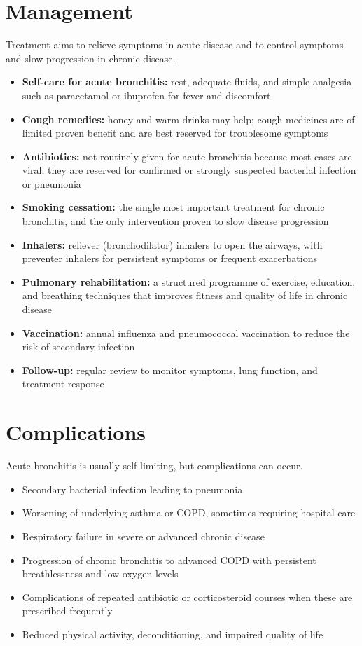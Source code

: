 \section*{Management}
Treatment aims to relieve symptoms in acute disease and to control symptoms and slow progression in chronic disease.

\begin{itemize}
    \item \textbf{Self-care for acute bronchitis:} rest, adequate fluids, and simple analgesia such as paracetamol or ibuprofen for fever and discomfort
    \item \textbf{Cough remedies:} honey and warm drinks may help; cough medicines are of limited proven benefit and are best reserved for troublesome symptoms
    \item \textbf{Antibiotics:} not routinely given for acute bronchitis because most cases are viral; they are reserved for confirmed or strongly suspected bacterial infection or pneumonia
    \item \textbf{Smoking cessation:} the single most important treatment for chronic bronchitis, and the only intervention proven to slow disease progression
    \item \textbf{Inhalers:} reliever (bronchodilator) inhalers to open the airways, with preventer inhalers for persistent symptoms or frequent exacerbations
    \item \textbf{Pulmonary rehabilitation:} a structured programme of exercise, education, and breathing techniques that improves fitness and quality of life in chronic disease
    \item \textbf{Vaccination:} annual influenza and pneumococcal vaccination to reduce the risk of secondary infection
    \item \textbf{Follow-up:} regular review to monitor symptoms, lung function, and treatment response
\end{itemize}

\section*{Complications}
Acute bronchitis is usually self-limiting, but complications can occur.

\begin{itemize}
    \item Secondary bacterial infection leading to pneumonia
    \item Worsening of underlying asthma or COPD, sometimes requiring hospital care
    \item Respiratory failure in severe or advanced chronic disease
    \item Progression of chronic bronchitis to advanced COPD with persistent breathlessness and low oxygen levels
    \item Complications of repeated antibiotic or corticosteroid courses when these are prescribed frequently
    \item Reduced physical activity, deconditioning, and impaired quality of life
\end{itemize}

